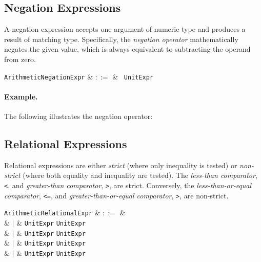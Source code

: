 
\subsection{Negation Expressions}
\label{c_expr_negation}

A negation expression accepts one argument of numeric type and produces a result of matching type.  Specifically, the {\em negation operator} mathematically negates the given value, which is always equivalent to subtracting the operand from zero.

\begin{syntax}
\verb+ArithmeticNegationExpr+ & $::=$ & \token{-}\ \verb+UnitExpr+\\
\end{syntax}

\paragraph{Example.} The following illustrates the negation operator:




\subsection{Relational Expressions}
\label{c_expr_relational}
Relational expressions are either {\em strict} (where only inequality is tested)  or {\em non-strict} (where both equality and inequality are tested).  The {\em less-than comparator}, \lstinline{<}, and {\em greater-than comparator}, \lstinline{>}, are strict.  Conversely, the {\em less-than-or-equal comparator}, \lstinline{<=}, and {\em greater-than-or-equal comparator}, \lstinline{>}, are non-strict.

\begin{syntax}
  \verb+ArithmeticRelationalExpr+ & $::=$ &\\
  & $|$ & \verb+UnitExpr+ \token{<} \verb+UnitExpr+\\
  & $|$ & \verb+UnitExpr+ \token{<=} \verb+UnitExpr+\\
  & $|$ & \verb+UnitExpr+ \token{=>} \verb+UnitExpr+\\
  & $|$ & \verb+UnitExpr+ \token{>} \verb+UnitExpr+\\
\end{syntax}

